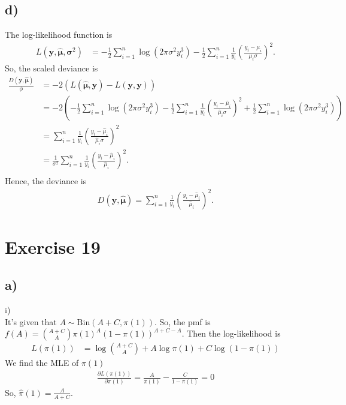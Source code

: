 \documentclass[a4paper]{article}
\begin{document}
\subsection{d)}
The log-likelihood function is
\begin{align*}
L(\bm{y},\widehat{\bm{\mu}},\bm{\sigma}^{2}) &= -\frac{1}{2}\sum_{i=1}^{n}\log\left(2\pi\sigma^{2}y_{i}^{3}\right) -\frac{1}{2}\sum_{i=1}^{n}\frac{1}{y_{i}}\left(\frac{y_{i}-\mu_{i}}{\mu_{i}\sigma}\right)^{2}.
\end{align*}
So, the scaled deviance is
\begin{align*}
\frac{D(\bm{y},\widehat{\bm{\mu}})}{\phi} &= -2\left(L\left(\widehat{\bm{\mu}},\bm{y}\right) - L\left(\bm{y},\bm{y}\right)\right)\\
&= -2\left(-\frac{1}{2}\sum_{i=1}^{n}\log\left(2\pi\sigma^{2}y_{i}^{3}\right) -\frac{1}{2}\sum_{i=1}^{n}\frac{1}{y_{i}}\left(\frac{y_{i}-\widehat{\mu}_{i}}{\widehat{\mu}_{i}\sigma}\right)^{2} + \frac{1}{2}\sum_{i=1}^{n}\log\left(2\pi\sigma^{2}y_{i}^{3}\right)\right)\\
&= \sum_{i=1}^{n}\frac{1}{y_{i}}\left(\frac{y_{i}-\widehat{\mu}_{i}}{\widehat{\mu}_{i}\sigma}\right)^{2}\\
&= \frac{1}{\sigma^{2}}\sum_{i=1}^{n}\frac{1}{y_{i}}\left(\frac{y_{i}-\widehat{\mu}_{i}}{\widehat{\mu}_{i}}\right)^{2}.\\
\end{align*}
Hence, the deviance is
\begin{align*}
D(\bm{y},\widehat{\bm{\mu}}) = \sum_{i=1}^{n}\frac{1}{y_{i}}\left(\frac{y_{i}-\widehat{\mu}_{i}}{\widehat{\mu}_{i}}\right)^{2}.
\end{align*}





\vspace{\baselineskip}
\section{Exercise 19}
\subsection{a)}

i)\\
It's given that $A \sim \mathrm{Bin}(A+C,\pi(1))$. So, the pmf is $f(A) = \binom{A+C}{A}\pi(1)^{A} (1-\pi(1))^{A+C-A}$. Then the log-likelihood is
\begin{align*}
L(\pi(1)) &= \log\binom{A+C}{A} + A\log\pi(1) + C\log(1-\pi(1))
\end{align*}
We find the MLE of $\pi(1)$
\begin{align*}
\frac{\partial L(\pi(1))}{\partial \pi(1)} = \frac{A}{\pi(1)} -\frac{C}{1-\pi(1)} = 0
\end{align*}
So, $\widehat{\pi}(1) = \frac{A}{A+C}$.\\
\end{document}
